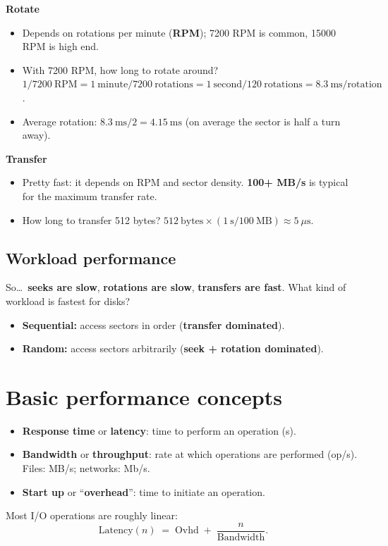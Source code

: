 \documentclass[11pt,a4paper]{article}
\begin{document}
\noindent\textbf{Rotate}
\begin{itemize}
  \item Depends on rotations per minute (\textbf{RPM}); 7200 RPM is common,
        15000 RPM is high end.
  \item With 7200 RPM, how long to rotate around?
        \(1/7200\ \text{RPM} = 1\ \text{minute}/7200\ \text{rotations}
        = 1\ \text{second}/120\ \text{rotations} = 8.3\ \text{ms/rotation}\).
  \item Average rotation: \(8.3\ \text{ms}/2 = 4.15\ \text{ms}\) (on average
        the sector is half a turn away).
\end{itemize}

\noindent\textbf{Transfer}
\begin{itemize}
  \item Pretty fast: it depends on RPM and sector density. \textbf{100+
        MB/s} is typical for the maximum transfer rate.
  \item How long to transfer 512 bytes?
        \(512\ \text{bytes} \times (1\ \text{s}/100\ \text{MB}) \approx 5\
        \mu\text{s}\).
\end{itemize}

\subsection{Workload performance}

So\ldots\ \textbf{seeks are slow}, \textbf{rotations are slow},
\textbf{transfers are fast}. What kind of workload is fastest for disks?
\begin{itemize}
  \item \textbf{Sequential:} access sectors in order (\textbf{transfer
        dominated}).
  \item \textbf{Random:} access sectors arbitrarily (\textbf{seek + rotation
        dominated}).
\end{itemize}

\section{Basic performance concepts}

\begin{defbox}
\begin{itemize}
  \item \textbf{Response time} or \textbf{latency}: time to perform an
        operation (s).
  \item \textbf{Bandwidth} or \textbf{throughput}: rate at which operations
        are performed (op/s). Files: MB/s; networks: Mb/s.
  \item \textbf{Start up} or ``\textbf{overhead}'': time to initiate an
        operation.
\end{itemize}
Most I/O operations are roughly linear:
\[
  \text{Latency}(n) \;=\; \text{Ovhd} \;+\; \frac{n}{\text{Bandwidth}}.
\]
\end{defbox}
\end{document}
